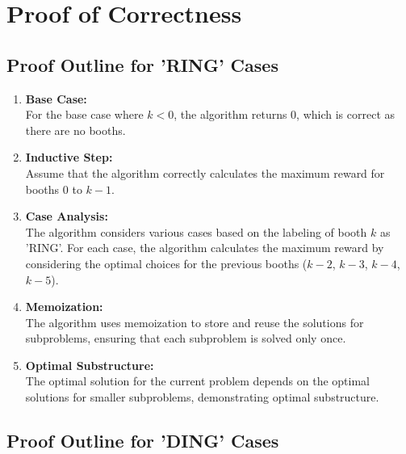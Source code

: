\documentclass{article}
\begin{document}
\section{Proof of Correctness}

\subsection{Proof Outline for 'RING' Cases}

\begin{enumerate}
    \item \textbf{Base Case:} \\
        For the base case where \(k < 0\), the algorithm returns 0, which is correct as there are no booths.
        
    \item \textbf{Inductive Step:} \\
        Assume that the algorithm correctly calculates the maximum reward for booths \(0\) to \(k-1\).
        
    \item \textbf{Case Analysis:} \\
        The algorithm considers various cases based on the labeling of booth \(k\) as 'RING'. For each case, the algorithm calculates the maximum reward by considering the optimal choices for the previous booths (\(k-2\), \(k-3\), \(k-4\), \(k-5\)).
        
    \item \textbf{Memoization:} \\
        The algorithm uses memoization to store and reuse the solutions for subproblems, ensuring that each subproblem is solved only once.
        
    \item \textbf{Optimal Substructure:} \\
        The optimal solution for the current problem depends on the optimal solutions for smaller subproblems, demonstrating optimal substructure.
\end{enumerate}

\subsection{Proof Outline for 'DING' Cases}
\end{document}
